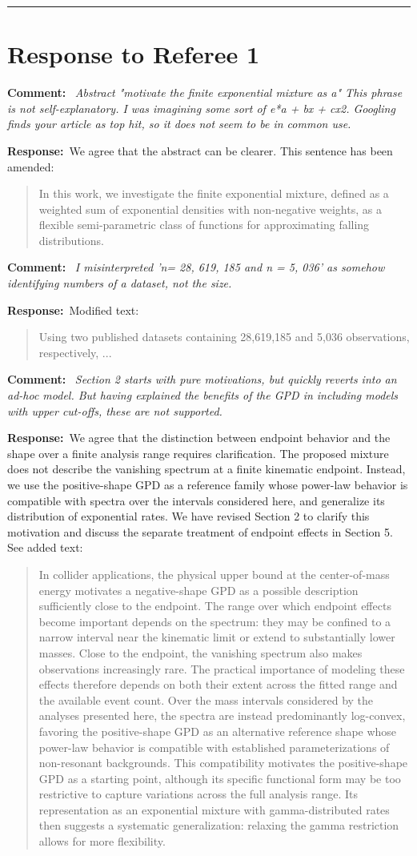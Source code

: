 \documentclass[11pt,a4paper]{article}
\newcommand{\refcomment}[1]{%
    \medskip\noindent\textbf{\color{refcolor}Comment:}\ %
    {\itshape #1}\par\smallskip
}
\newcommand{\response}{\noindent\textbf{Response:}\ }
\newcommand{\addedtext}[1]{%
    \smallskip\begin{quote}\color{quotecolor}\small #1\end{quote}\smallskip
}
\begin{document}
\bigskip
\hrule
\bigskip

\section*{Response to Referee 1}

\refcomment{Abstract "motivate the finite exponential mixture as a" This phrase is not
self-explanatory. I was imagining some sort of e*a + bx + cx2. Googling finds your article as top hit, so it does not seem to be in common use.}
\response We agree that the abstract can be clearer. This sentence has been amended:
\addedtext{In this work, we investigate the finite exponential mixture, defined as a weighted sum of exponential densities with non-negative weights, as a flexible semi-parametric class of functions for approximating falling distributions.}

\refcomment{I misinterpreted ’n= 28, 619, 185 and n = 5, 036’ as somehow identifying
numbers of a dataset, not the size.}
\response Modified text:
\addedtext{Using two published datasets containing 28,619,185 and 5,036 observations, respectively, ...}

\refcomment{Section 2 starts with pure motivations, but quickly reverts into an ad-hoc
model. But having explained the benefits of the GPD in including models with upper cut-offs, these are not supported.}
\response We agree that the distinction between endpoint behavior and the shape over a finite analysis range requires clarification. The proposed mixture does not describe the vanishing spectrum at a finite kinematic endpoint. Instead, we use the positive-shape GPD as a reference family whose power-law behavior is compatible with spectra over the intervals considered here, and generalize its distribution of exponential rates. We have revised Section 2 to clarify this motivation and discuss the separate treatment of endpoint effects in Section 5. See added text:

\addedtext{In collider applications, the physical upper bound at the center-of-mass energy motivates a negative-shape GPD as a possible description sufficiently close to the endpoint. The range over which endpoint effects become important depends on the spectrum: they may be confined to a narrow interval near the kinematic limit or extend to substantially lower masses. Close to the endpoint, the vanishing spectrum also makes observations increasingly rare. The practical importance of modeling these effects therefore depends on both their extent across the fitted range and the available event count. Over the mass intervals considered by the analyses presented here, the spectra are instead predominantly log-convex, favoring the positive-shape GPD as an alternative reference shape whose power-law behavior is compatible with established parameterizations of non-resonant backgrounds. This compatibility motivates the positive-shape GPD as a starting point, although its specific functional form may be too restrictive to capture variations across the full analysis range. Its representation as an exponential mixture with gamma-distributed rates then suggests a systematic generalization: relaxing the gamma restriction allows for more flexibility.}
\end{document}
